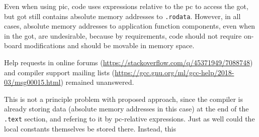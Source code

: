 Even when using \gls{pic}, code uses expressions relative to the \gls{pc} to access the \gls{got}, but \gls{got} still contains absolute memory addresses to \texttt{.rodata}. However, in all cases, absolute memory addresses to application function components, even when in the \gls{got}, are undesirable, because by requirements, code should not require on-board modifications and should be movable in memory space.

Help requests in online forums (\url{https://stackoverflow.com/q/45371949/7088748}) and compiler support mailing lists (\url{https://gcc.gnu.org/ml/gcc-help/2018-03/msg00015.html}) remained unanswered.

This is not a principle problem with proposed approach, since the compiler is already storing data (absolute memory addresses in this case) at the end of the \texttt{.text} section, and refering to it by \gls{pc}-relative expressions. Just as well could the local constants themselves be stored there. Instead, this 